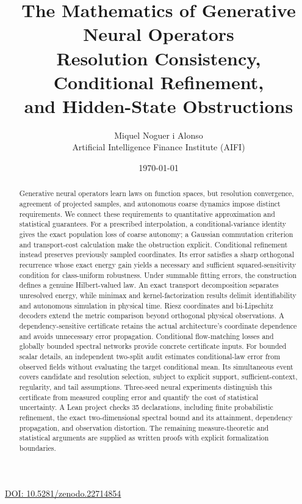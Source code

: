 \documentclass[11pt]{article}
\title{\textbf{The Mathematics of Generative Neural Operators}\\[0.35em]
\large Resolution Consistency, Conditional Refinement,\\ and Hidden-State Obstructions}
\author{Miquel Noguer i Alonso\\
\small Artificial Intelligence Finance Institute (AIFI)}
\date{\today}
\numberwithin{equation}{section}
\theoremstyle{definition}
\theoremstyle{remark}
\begin{document}
\maketitle
\thispagestyle{empty}
\begin{center}\small\href{https://doi.org/10.5281/zenodo.22714854}{DOI: 10.5281/zenodo.22714854}\end{center}
\begin{abstract}
Generative neural operators learn laws on function spaces, but resolution convergence, agreement of projected samples, and autonomous coarse dynamics impose distinct requirements. We connect these requirements to quantitative approximation and statistical guarantees. For a prescribed interpolation, a conditional-variance identity gives the exact population loss of coarse autonomy; a Gaussian commutation criterion and transport-cost calculation make the obstruction explicit. Conditional refinement instead preserves previously sampled coordinates. Its error satisfies a sharp orthogonal recurrence whose exact energy gain yields a necessary and sufficient squared-sensitivity condition for class-uniform robustness. Under summable fitting errors, the construction defines a genuine Hilbert-valued law. An exact transport decomposition separates unresolved energy, while minimax and kernel-factorization results delimit identifiability and autonomous simulation in physical time. Riesz coordinates and bi-Lipschitz decoders extend the metric comparison beyond orthogonal physical observations. A dependency-sensitive certificate retains the actual architecture's coordinate dependence and avoids unnecessary error propagation. Conditional flow-matching losses and globally bounded spectral networks provide concrete certificate inputs. For bounded scalar details, an independent two-split audit estimates conditional-law error from observed fields without evaluating the target conditional mean. Its simultaneous event covers candidate and resolution selection, subject to explicit support, sufficient-context, regularity, and tail assumptions. Three-seed neural experiments distinguish this certificate from measured coupling error and quantify the cost of statistical uncertainty. A Lean project checks 35 declarations, including finite probabilistic refinement, the exact two-dimensional spectral bound and its attainment, dependency propagation, and observation distortion. The remaining measure-theoretic and statistical arguments are supplied as written proofs with explicit formalization boundaries.
\end{abstract}
\end{document}
